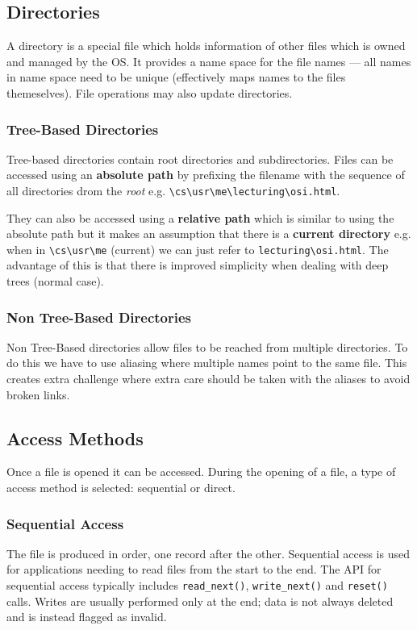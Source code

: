 \documentclass{article}%
\begin{document}
\subsection{Directories}
\label{sec:org548adf4}
A directory is a special file which holds information of other files which is owned and managed by the OS.
It provides a name space for the file names --- all names in name space need to be unique (effectively maps names to the files themeselves).
File operations may also update directories.

\subsubsection{Tree-Based Directories}
\label{sec:orga743f38}
Tree-based directories contain root directories and subdirectories.
Files can be accessed using an \textbf{absolute path} by prefixing the filename with the sequence of all directories drom the \emph{root} e.g. \texttt{\textbackslash{}cs\textbackslash{}usr\textbackslash{}me\textbackslash{}lecturing\textbackslash{}osi.html}.

They can also be accessed using a \textbf{relative path} which is similar to using the absolute path but it makes an assumption that there is a \textbf{current directory} e.g. when in \texttt{\textbackslash{}cs\textbackslash{}usr\textbackslash{}me} (current) we can just refer to \texttt{lecturing\textbackslash{}osi.html}.
The advantage of this is that there is improved simplicity when dealing with deep trees (normal case).

\subsubsection{Non Tree-Based Directories}
\label{sec:orge82e840}
Non Tree-Based directories allow files to be reached from multiple directories.
To do this we have to use aliasing where multiple names point to the same file.
This creates extra challenge where extra care should be taken with the aliases to avoid broken links.

\subsection{Access Methods}
\label{sec:orgb36ab2d}
Once a file is opened it can be accessed.
During the opening of a file, a type of access method is selected: sequential or direct.

\subsubsection{Sequential Access}
\label{sec:org71aab54}
The file is produced in order, one record after the other.
Sequential access is used for applications needing to read files from the start to the end.
The API for sequential access typically includes \texttt{read\_next()}, \texttt{write\_next()} and \texttt{reset()} calls.
Writes are usually performed only at the end; data is not always deleted and is instead flagged as invalid.
\end{document}
